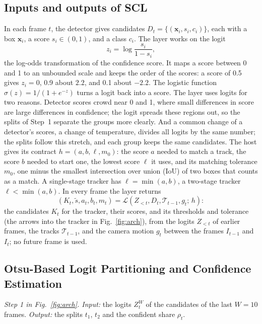 \documentclass[pdflatex,sn-mathphys-num,iicol]{sn-jnl}
\begin{document}
\subsection{Inputs and outputs of SCL}\label{sec:problem}
In each frame $t$, the detector gives candidates $D_t=\{(\mathbf{x}_i,s_i,c_i)\}$, each with a box
$\mathbf{x}_i$, a score $s_i\in(0,1)$, and a class $c_i$. The layer works on the logit
\begin{equation}
z_i=\log\frac{s_i}{1-s_i},
\label{eq:logit}
\end{equation}
the log-odds transformation of the confidence score. It maps a score between 0 and 1 to an
unbounded scale and keeps the order of the scores: a score of 0.5 gives $z_i=0$, 0.9 about $2.2$,
and 0.1 about $-2.2$. The logistic function $\sigma(z)=1/(1+e^{-z})$ turns a logit back into a
score. The layer uses logits for two reasons. Detector scores crowd near 0 and 1, where small
differences in score are large differences in confidence; the logit spreads these regions out, so
the splits of Step~1 separate the groups more clearly. And a common change of a detector's scores,
a change of temperature, divides all logits by the same number; the splits follow this stretch,
and each group keeps the same candidates. The host gives its contract $h=(a,b,\ell,m_0)$: the score $a$ needed to match a track, the
score $b$ needed to start one, the lowest score $\ell$ it uses, and its matching tolerance $m_0$,
one minus the smallest intersection over union (IoU) of two boxes that counts as a match. A
single-stage tracker has $\ell=\min(a,b)$, a two-stage tracker $\ell<\min(a,b)$. In every frame
the layer returns
\begin{equation}
\left(K_t,\tilde{s},a_t,b_t,m_t\right)=
\mathcal{L}\left(Z_{<t},D_t,\mathcal{T}_{t-1},g_t;\,h\right):
\label{eq:layer}
\end{equation}
the candidates $K_t$ for the tracker, their scores, and its thresholds and tolerance (the arrows
into the tracker in Fig.~\ref{fig:arch}), from the logits $Z_{<t}$ of earlier frames, the tracks
$\mathcal{T}_{t-1}$, and the camera motion $g_t$ between the frames $I_{t-1}$ and $I_t$; no future
frame is used.

\subsection{Otsu-Based Logit Partitioning and Confidence Estimation}\label{sec:calib}
\emph{Step 1 in Fig.~\ref{fig:arch}. Input:} the logits $Z_t^W$ of the candidates of the last $W=10$ frames. \emph{Output:} the
splits $t_1$, $t_2$ and the confident share $\rho_t$.
\end{document}
